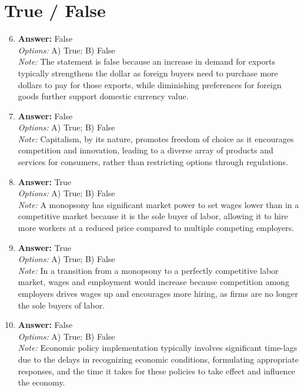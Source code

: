 \documentclass[12pt]{article}
\begin{document}
\section*{True / False}
\begin{enumerate}[label=\arabic*.]
\setcounter{enumi}{5}
\item \textbf{Answer:} False
\\ \textit{Options:} A) True; B) False
\\ \textit{Note:} The statement is false because an increase in demand for exports typically strengthens the dollar as foreign buyers need to purchase more dollars to pay for those exports, while diminishing preferences for foreign goods further support domestic currency value.
\item \textbf{Answer:} False
\\ \textit{Options:} A) True; B) False
\\ \textit{Note:} Capitalism, by its nature, promotes freedom of choice as it encourages competition and innovation, leading to a diverse array of products and services for consumers, rather than restricting options through regulations.
\item \textbf{Answer:} True
\\ \textit{Options:} A) True; B) False
\\ \textit{Note:} A monopsony has significant market power to set wages lower than in a competitive market because it is the sole buyer of labor, allowing it to hire more workers at a reduced price compared to multiple competing employers.
\item \textbf{Answer:} True
\\ \textit{Options:} A) True; B) False
\\ \textit{Note:} In a transition from a monopsony to a perfectly competitive labor market, wages and employment would increase because competition among employers drives wages up and encourages more hiring, as firms are no longer the sole buyers of labor.
\item \textbf{Answer:} False
\\ \textit{Options:} A) True; B) False
\\ \textit{Note:} Economic policy implementation typically involves significant time-lags due to the delays in recognizing economic conditions, formulating appropriate responses, and the time it takes for these policies to take effect and influence the economy.
\end{enumerate}
\end{document}
